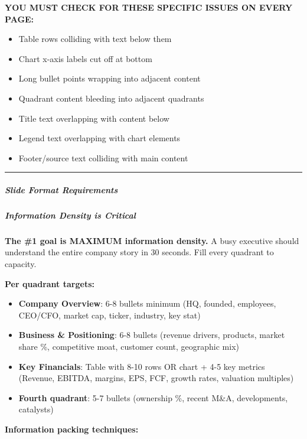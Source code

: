\documentclass[11pt]{article}
\begin{document}
\textbf{YOU MUST CHECK FOR THESE SPECIFIC ISSUES ON EVERY PAGE:}

\begin{itemize}[leftmargin=*,itemsep=2pt,topsep=2pt]
\item {} Table rows colliding with text below them
\item {} Chart x-axis labels cut off at bottom
\item {} Long bullet points wrapping into adjacent content
\item {} Quadrant content bleeding into adjacent quadrants
\item {} Title text overlapping with content below
\item {} Legend text overlapping with chart elements
\item {} Footer/source text colliding with main content
\end{itemize}

\vspace{0.5em}\hrule\vspace{0.5em}

\subparagraph{Slide Format Requirements}\mbox{}\par

\subparagraph{Information Density is Critical}\mbox{}\par

\textbf{The \#1 goal is MAXIMUM information density.} A busy executive should understand the entire company story in 30 seconds. Fill every quadrant to capacity.


\textbf{Per quadrant targets:}

\begin{itemize}[leftmargin=*,itemsep=2pt,topsep=2pt]
\item {} \textbf{Company Overview}: 6-8 bullets minimum (HQ, founded, employees, CEO/CFO, market cap, ticker, industry, key stat)
\item {} \textbf{Business \& Positioning}: 6-8 bullets (revenue drivers, products, market share \%, competitive moat, customer count, geographic mix)
\item {} \textbf{Key Financials}: Table with 8-10 rows OR chart + 4-5 key metrics (Revenue, EBITDA, margins, EPS, FCF, growth rates, valuation multiples)
\item {} \textbf{Fourth quadrant}: 5-7 bullets (ownership \%, recent M\&A, developments, catalysts)
\end{itemize}

\textbf{Information packing techniques:}
\end{document}
